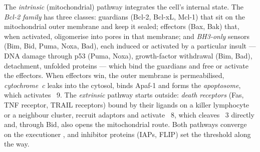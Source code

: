 \begin{definition}\label{def:b3:cell-cycle-apoptosis:pathways}
The \emph{intrinsic} (mitochondrial) pathway integrates the cell's
internal state. The \emph{Bcl-2 family} has three classes: guardians
(Bcl-2, Bcl-xL, Mcl-1) that sit on the mitochondrial outer membrane and
keep it sealed; effectors (Bax, Bak) that, when activated, oligomerise
into pores in that membrane; and \emph{BH3-only} sensors (Bim, Bid,
Puma, Noxa, Bad), each induced or activated by a particular insult ---
DNA damage through p53 (Puma, Noxa), growth-factor withdrawal (Bim,
Bad), detachment, unfolded proteins --- which bind the guardians and
free or activate the effectors. When effectors win, the outer membrane
is permeabilised, \emph{cytochrome~c} leaks into the cytosol, binds
Apaf-1 and forms the \emph{apoptosome}, which activates ~9. The
\emph{extrinsic} pathway starts outside: \emph{death receptors} (Fas,
TNF receptor, TRAIL receptors) bound by their ligands on a killer
lymphocyte or a neighbour cluster, recruit adaptors and activate
~8, which cleaves ~3 directly and, through Bid, also
opens the mitochondrial route. Both pathways converge on the
executioner , and inhibitor proteins (IAPs, FLIP) set the
threshold along the way.
\end{definition}

